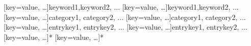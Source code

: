 \begin{ltxsyntax}

[key=value, \dots]{keyword1,keyword2, ...}
[key=value, \dots]{keyword1,keyword2, ...}
[key=value, \dots]{category1, category2, ...}
[key=value, \dots]{category1, category2, ...}
[key=value, \dots]{entrykey1, entrykey2, ...}
[key=value, \dots]{entrykey1, entrykey2, ...}
[key=value, \dots]{*}
[key=value, \dots]{*}

\end{ltxsyntax}


